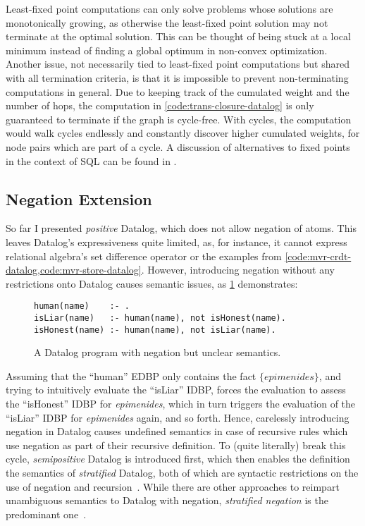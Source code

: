 Least-fixed point computations can only solve problems whose solutions
are monotonically growing, as otherwise the least-fixed point solution may not
terminate at the optimal solution.
This can be thought of being stuck at a local minimum instead of finding
a global optimum in non-convex optimization.
Another issue, not necessarily tied to least-fixed point computations but shared
with all termination criteria, is that it is impossible to prevent
non-terminating computations in general.
Due to keeping track of the cumulated weight and the number of hops,
the computation in \ref{code:trans-closure-datalog} is only guaranteed to terminate
if the graph is cycle-free.
With cycles, the computation would walk cycles endlessly and constantly discover
higher cumulated weights, for node pairs which are part of a cycle.
A discussion of alternatives to fixed points in the context of SQL
can be found in \cite{hirn2023fix}.

\subsection{Negation Extension}\label{sec:datalog-negation}

So far I presented \emph{positive} Datalog, which does not allow negation of
atoms.
This leaves Datalog's expressiveness quite limited, as, for instance, it cannot
express relational algebra's set difference operator or the examples
from \ref{code:mvr-crdt-datalog,code:mvr-store-datalog}.
However, introducing negation without any restrictions onto Datalog causes
semantic issues, as \ref{code:negative-datalog-issue} demonstrates:

\begin{figure}[htpb]
	\centering
	\begin{lstlisting}[keepspaces]
human(name)    :- .
isLiar(name)   :- human(name), not isHonest(name).
isHonest(name) :- human(name), not isLiar(name).
\end{lstlisting}
	\caption{A Datalog program with negation but unclear semantics.}\label{code:negative-datalog-issue}
\end{figure}

Assuming that the ``human'' \ac{EDBP} only contains the fact
\(\{ \mathit{epimenides} \}\)\footnotemark{}, and trying to intuitively evaluate the
``isLiar'' \ac{IDBP}, forces the evaluation to assess the ``isHonest'' \ac{IDBP}
for \textit{epimenides}, which in turn triggers the evaluation of the
``isLiar'' \ac{IDBP} for \textit{epimenides} again, and so forth.
Hence, carelessly introducing negation in Datalog causes undefined semantics
in case of recursive rules which use negation as part of their recursive definition.
To (quite literally) break this cycle, \emph{semipositive} Datalog is introduced
first, which then enables the definition the semantics of \emph{stratified}
Datalog, both of which are syntactic restrictions on the use of negation and
recursion~\cite{green2013datalog}.
While there are other approaches to reimpart unambiguous semantics to
Datalog with negation, \emph{stratified negation} is the predominant
one~\cite{green2013datalog}.

